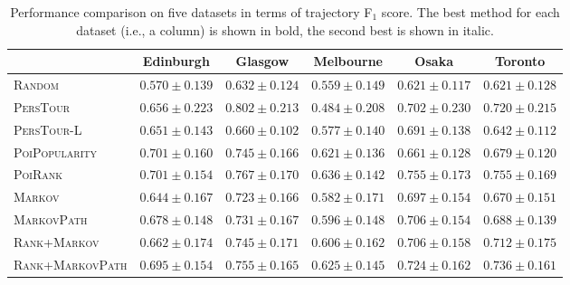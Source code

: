 \begin{table*}[t]
\caption{Performance comparison on five datasets in terms of trajectory F$_1$ score. 
        The best method for each dataset (i.e., a column) is shown in bold, the second best is shown in italic.}
\label{tab:f1}
\centering
\setlength{\tabcolsep}{10pt} %
\begin{tabular}{l|ccccc} \hline
 & Edinburgh & Glasgow & Melbourne & Osaka & Toronto \\ \hline
\textsc{Random} & $0.570\pm0.139$ & $0.632\pm0.124$ & $0.559\pm0.149$ & $0.621\pm0.117$ & $0.621\pm0.128$ \\
\textsc{PersTour}\cite{ijcai15} & $0.656\pm0.223$ & $\mathbf{0.802\pm0.213}$ & $0.484\pm0.208$ & $0.702\pm0.230$ & $0.720\pm0.215$ \\
\textsc{PersTour-L} & $0.651\pm0.143$ & $0.660\pm0.102$ & $0.577\pm0.140$ & $0.691\pm0.138$ & $0.642\pm0.112$ \\
\textsc{PoiPopularity} & $\mathit{0.701\pm0.160}$ & $0.745\pm0.166$ & $0.621\pm0.136$ & $0.661\pm0.128$ & $0.679\pm0.120$ \\
\textsc{PoiRank} & $\mathbf{0.701\pm0.154}$ & $\mathit{0.767\pm0.170}$ & $\mathbf{0.636\pm0.142}$ & $\mathbf{0.755\pm0.173}$ & $\mathbf{0.755\pm0.169}$ \\
\textsc{Markov} & $0.644\pm0.167$ & $0.723\pm0.166$ & $0.582\pm0.171$ & $0.697\pm0.154$ & $0.670\pm0.151$ \\
\textsc{MarkovPath} & $0.678\pm0.148$ & $0.731\pm0.167$ & $0.596\pm0.148$ & $0.706\pm0.154$ & $0.688\pm0.139$ \\
\textsc{Rank+Markov} & $0.662\pm0.174$ & $0.745\pm0.171$ & $0.606\pm0.162$ & $0.706\pm0.158$ & $0.712\pm0.175$ \\
\textsc{Rank+MarkovPath} & $0.695\pm0.154$ & $0.755\pm0.165$ & $\mathit{0.625\pm0.145}$ & $\mathit{0.724\pm0.162}$ & $\mathit{0.736\pm0.161}$ \\
\hline
\end{tabular}\captionmoveup
\end{table*}

